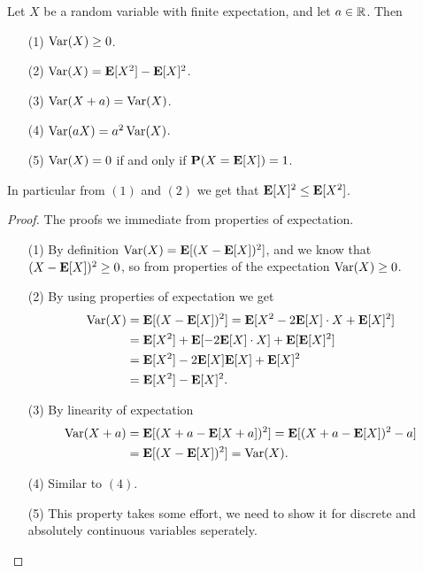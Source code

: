 \documentclass[11pt,a4paper]{article}
\begin{document}
\begin{proposition}
  Let $X$ be a random variable with finite expectation,
  and let $a \in \mathbb{R}$.
  Then
  \begin{enumerate}
    \item[(1)] $\operatorname{Var}(X) \geq 0$.
    \item[(2)] $\operatorname{Var}(X) = \mathbf{E}[X^2] - \mathbf{E}[X]^2$.
    \item[(3)] $\operatorname{Var}(X + a) = \operatorname{Var}(X)$.
    \item[(4)] $\operatorname{Var}(a X) = a^2 \operatorname{Var}(X)$.
    \item[(5)] $\operatorname{Var}(X) = 0$ if and only if $\mathbf{P}(X = \mathbf{E}[X]) = 1$.
  \end{enumerate}
  In particular from $(1)$ and $(2)$ we get that $\mathbf{E}[X]^2 \le \mathbf{E}[X^2]$.
\end{proposition}
\begin{proof}
  The proofs we immediate from properties of expectation.
  \begin{enumerate}
    \item[(1)]
      By definition $\operatorname{Var}(X) = \mathbf{E}[(X - \mathbf{E}[X])^2]$,
      and we know that $(X - \mathbf{E}[X])^2 \geq 0$,
      so from properties of the expectation $\operatorname{Var}(X) \geq 0$.
    \item[(2)] By using properties of expectation we get
      \begin{align*}
        \operatorname{Var}(X) &= \mathbf{E}[(X - \mathbf{E}[X])^2] = \mathbf{E}[X^2 - 2\mathbf{E}[X] \cdot X + \mathbf{E}[X]^2] \\&=
        \mathbf{E}[X^2] + \mathbf{E}[-2\mathbf{E}[X] \cdot X] + \mathbf{E}[\mathbf{E}[X]^2] \\&=
        \mathbf{E}[X^2] -2 \mathbf{E}[X]\mathbf{E}[X] + \mathbf{E}[X]^2 \\&=
        \mathbf{E}[X^2] - \mathbf{E}[X]^2.
      \end{align*}
    \item[(3)] By linearity of expectation
      \begin{align*}
        \operatorname{Var}(X + a) &=
        \mathbf{E}[(X + a - \mathbf{E}[X + a])^2] =
        \mathbf{E}[(X + a - \mathbf{E}[X])^2 - a] \\ &=
        \mathbf{E}[(X - \mathbf{E}[X])^2] = \operatorname{Var}(X).
      \end{align*}
    \item[(4)] Similar to $(4)$.
    \item[(5)] This property takes some effort,
      we need to show it for discrete and absolutely continuous variables
      seperately.
  \end{enumerate}
\end{proof}
\end{document}
